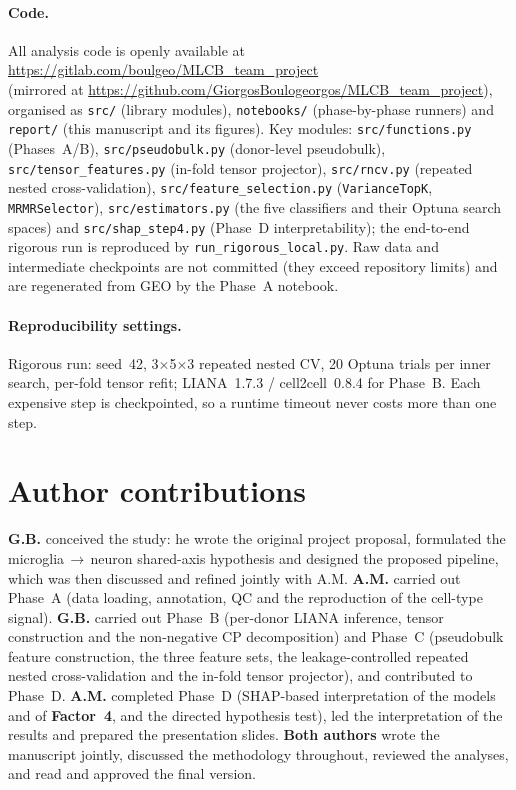 \documentclass[11pt]{article}
\newcommand{\factorfour}{\textbf{Factor~4}}
\newcommand{\code}[1]{\texttt{\small #1}}
\begin{document}
\paragraph{Code.} All analysis code is openly available at\\
\url{https://gitlab.com/boulgeo/MLCB_team_project}\\
(mirrored at \url{https://github.com/GiorgosBoulogeorgos/MLCB_team_project}),
organised as \code{src/} (library modules), \code{notebooks/} (phase-by-phase
runners) and \code{report/} (this manuscript and its figures). Key modules:
\code{src/functions.py} (Phases~A/B), \code{src/pseudobulk.py} (donor-level
pseudobulk), \code{src/tensor\_features.py} (in-fold tensor projector),
\code{src/rncv.py} (repeated nested cross-validation),
\code{src/feature\_selection.py} (\code{VarianceTopK}, \code{MRMRSelector}),
\code{src/estimators.py} (the five classifiers and their Optuna search spaces)
and \code{src/shap\_step4.py} (Phase~D interpretability); the end-to-end
rigorous run is reproduced by \code{run\_rigorous\_local.py}. Raw data and
intermediate checkpoints are not committed (they exceed repository limits) and
are regenerated from GEO by the Phase~A notebook.

\paragraph{Reproducibility settings.} Rigorous run: seed~42,
3$\times$5$\times$3 repeated nested CV, 20 Optuna trials per inner search,
per-fold tensor refit; LIANA~1.7.3 / cell2cell~0.8.4 for Phase~B. Each expensive
step is checkpointed, so a runtime timeout never costs more than one step.

\section*{Author contributions}

\textbf{G.B.} conceived the study: he wrote the original project proposal,
formulated the microglia\,$\rightarrow$\,neuron shared-axis hypothesis and
designed the proposed pipeline, which was then discussed and refined jointly
with A.M. \textbf{A.M.} carried out Phase~A (data loading, annotation, QC and
the reproduction of the cell-type signal). \textbf{G.B.} carried out Phase~B
(per-donor LIANA inference, tensor construction and the non-negative CP
decomposition) and Phase~C (pseudobulk feature construction, the three feature
sets, the leakage-controlled repeated nested cross-validation and the
in-fold tensor projector), and contributed to Phase~D. \textbf{A.M.} completed
Phase~D (SHAP-based interpretation of the models and of \factorfour, and the
directed hypothesis test), led the interpretation of the results and prepared
the presentation slides. \textbf{Both authors} wrote the manuscript jointly,
discussed the methodology throughout, reviewed the analyses, and read and
approved the final version.
\end{document}
